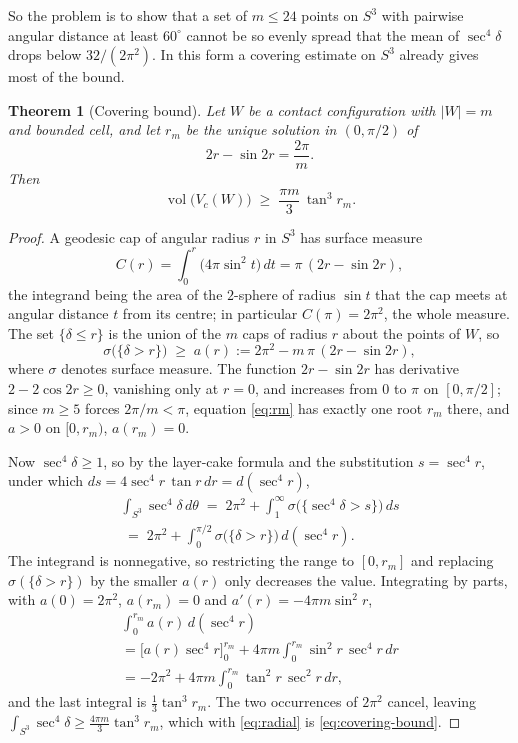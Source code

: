 \documentclass[11pt,reqno]{amsart}
\renewcommand{\_}{\origunderscore\allowbreak}
\numberwithin{equation}{section}
\theoremstyle{plain}
\newtheorem{thm}{Theorem}[section]
\theoremstyle{definition}
\theoremstyle{remark}
\DeclareMathOperator{\vol}{vol}
\begin{document}
So the problem is to show that a set of $m\le24$ points on $S^3$ with
pairwise angular distance at least $60^\circ$ cannot be so evenly spread
that the mean of $\sec^4\delta$ drops below $32/(2\pi^2)$. In this form
a covering estimate on $S^3$ already gives most of the bound.

\begin{thm}[Covering bound]\label{thm:covering-bound}
Let $W$ be a contact configuration with $|W|=m$ and bounded cell, and
let $r_m$ be the unique solution in $(0,\pi/2)$ of
\begin{equation}\label{eq:rm}
  2r-\sin2r=\frac{2\pi}{m} .
\end{equation}
Then
\begin{equation}\label{eq:covering-bound}
  \vol\bigl(V_c(W)\bigr)\;\ge\;\frac{\pi m}{3}\,\tan^3 r_m .
\end{equation}
\end{thm}

\begin{proof}
A geodesic cap of angular radius $r$ in $S^3$ has surface measure
\[
  C(r)=\int_0^r\bigl(4\pi\sin^2t\bigr)\,dt=\pi\,(2r-\sin2r),
\]
the integrand being the area of the $2$-sphere of radius $\sin t$ that
the cap meets at angular distance $t$ from its centre; in particular
$C(\pi)=2\pi^2$, the whole measure. The set $\{\delta\le r\}$ is the
union of the $m$ caps of radius $r$ about the points of $W$, so
\[
  \sigma\bigl(\{\delta>r\}\bigr)\;\ge\;a(r):=2\pi^2-m\,\pi\,(2r-\sin2r),
\]
where $\sigma$ denotes surface measure. The function $2r-\sin2r$ has
derivative $2-2\cos2r\ge0$, vanishing only at $r=0$, and increases from
$0$ to $\pi$ on $[0,\pi/2]$; since $m\ge5$ forces $2\pi/m<\pi$, equation
\eqref{eq:rm} has exactly one root $r_m$ there, and $a>0$ on $[0,r_m)$,
$a(r_m)=0$.

Now $\sec^4\delta\ge1$, so by the layer-cake formula and the
substitution $s=\sec^4r$, under which
$ds=4\sec^4r\,\tan r\,dr=d(\sec^4r)$,
\begin{multline*}
  \int_{S^3}\sec^4\delta\,d\theta
  \;=\;2\pi^2+\int_1^{\infty}\sigma\bigl(\{\sec^4\delta>s\}\bigr)\,ds\\
  \;=\;2\pi^2+\int_0^{\pi/2}\sigma\bigl(\{\delta>r\}\bigr)\,d(\sec^4r).
\end{multline*}
The integrand is nonnegative, so restricting the range to $[0,r_m]$ and
replacing $\sigma(\{\delta>r\})$ by the smaller $a(r)$ only decreases
the value. Integrating by parts, with $a(0)=2\pi^2$, $a(r_m)=0$ and
$a'(r)=-4\pi m\sin^2r$,
\begin{multline*}
  \int_0^{r_m}a(r)\,d(\sec^4r)\\
  =\bigl[a(r)\sec^4r\bigr]_0^{r_m}+4\pi m\int_0^{r_m}\sin^2r\,\sec^4r\,dr\\
  =-2\pi^2+4\pi m\int_0^{r_m}\tan^2r\,\sec^2r\,dr,
\end{multline*}
and the last integral is $\tfrac13\tan^3r_m$. The two occurrences of
$2\pi^2$ cancel, leaving
$\int_{S^3}\sec^4\delta\ge\tfrac{4\pi m}{3}\tan^3r_m$, which with
\eqref{eq:radial} is \eqref{eq:covering-bound}.
\end{proof}
\end{document}
